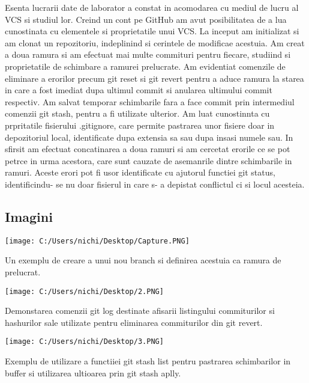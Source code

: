 	Esenta lucrarii date de laborator a constat in acomodarea cu mediul de lucru al VCS si studiul lor. Creind un cont pe GitHub am avut posibilitatea de a lua cunostinata cu elementele si proprietatile unui VCS. La inceput am initializat si am clonat un repozitoriu, indeplinind si cerintele de modificae acestuia. Am creat a doua ramura si am efectuat mai multe commituri pentru fiecare, studiind si proprietatile de schimbare a ramurei prelucrate. Am evidentiat comenzile de eliminare a erorilor precum git reset si git revert pentru a aduce ramura la starea in care a fost imediat dupa ultimul commit si anularea ultimului commit respectiv. Am salvat temporar schimbarile fara a face commit prin intermediul comenzii git stash, pentru a fi utilizate ulterior. Am luat cunostinnta cu prpritatile fisierului .gitignore, care permite pastrarea unor fisiere doar in depozitoriul local, identificate dupa extensia sa sau dupa insasi numele sau. In sfirsit am efectuat concatinarea a doua ramuri si am cercetat erorile ce se pot petrce in urma acestora, care sunt cauzate de asemanrile dintre schimbarile in ramuri. Aceste erori pot fi usor identificate cu ajutorul functiei git status, identificindu- se nu doar fisierul in care s- a depistat conflictul ci si locul acesteia.



\subsection{Imagini}

\texttt{[image: C:/Users/nichi/Desktop/Capture.PNG]}

	Un exemplu de creare a unui nou branch si definirea acestuia ca ramura de prelucrat.


\texttt{[image: C:/Users/nichi/Desktop/2.PNG]}

	Demonstarea comenzii git log destinate afisarii listingului commiturilor si hashurilor sale utilizate pentru eliminarea commiturilor din git revert.


\texttt{[image: C:/Users/nichi/Desktop/3.PNG]}

	Exemplu de utilizare a functiiei git stash list pentru pastrarea schimbarilor in buffer si utilizarea ultioarea prin git stash aplly.






